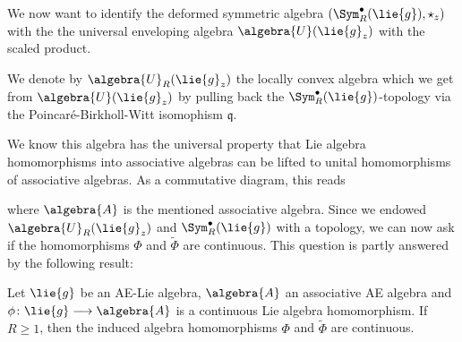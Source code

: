 We now want to identify the deformed symmetric algebra $(\Sym_R^{\bullet}
(\lie{g}), \star_z)$ with the the universal enveloping algebra $\algebra{U}
(\lie{g}_z)$ with the scaled product.
\begin{definition}
	We denote by $\algebra{U}_R(\lie{g}_z)$ the locally convex algebra which we 
	get from $\algebra{U}(\lie{g}_z)$ by pulling back the $\Sym_R^{\bullet}
	(\lie{g})$-topology via the Poincar\'e-Birkholl-Witt isomophism
	$\mathfrak{q}$.
\end{definition}
We know this algebra has the universal property that Lie algebra 
homomorphisms into associative algebras can be lifted to unital homomorphisms 
of associative algebras. As a commutative diagram, this reads
\begin{center}
\end{center}
where $\algebra{A}$ is the mentioned associative algebra. Since we endowed 
$\algebra{U}_R(\lie{g}_z)$ and $\Sym_R^{\bullet}(\lie{g})$ with a topology, we 
can now ask if the homomorphisms $\Phi$ and $\widetilde{\Phi}$ are continuous. 
This question is partly answered by the following result:
\begin{proposition}
    \label{LCAna:Prop:Semi-functoriality}%
    Let $\lie{g}$ be an AE-Lie algebra, $\algebra{A}$ an associative
    AE algebra and $\phi \colon \lie{g} \longrightarrow \algebra{A}$
    is a continuous Lie algebra homomorphism.  If $R \geq 1$, then the
    induced algebra homomorphisms $\Phi$ and $\widetilde{\Phi}$ are
    continuous.
\end{proposition}
